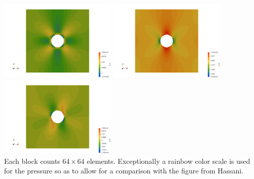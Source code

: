 \begin{center}
\includegraphics[width=5.6cm]{python_codes/fieldstone_124/results/exp1/exx}
\includegraphics[width=5.6cm]{python_codes/fieldstone_124/results/exp1/eyy}
\includegraphics[width=5.6cm]{python_codes/fieldstone_124/results/exp1/exy}\\
{\captionfont Each block counts $64\times 64$ elements. Exceptionally a rainbow
color scale is used for the pressure so as to allow for a comparison with 
the figure from Hassani.}
\end{center}


